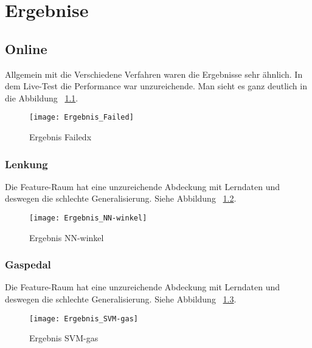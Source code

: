 
\chapter{Ergebnise} %
\label{cha:Ergebnise}

\section{Online} %
\label{sec:Online}
Allgemein mit die Verschiedene Verfahren waren die Ergebnisse sehr ähnlich. In dem Live-Test die Performance war unzureichende. Man sieht es ganz deutlich in die Abbildung ~\ref{fig:Ergebnis_Failed}.

\begin{figure}[htbp]
\begin{center}
\texttt{[image: Ergebnis\_Failed]}
\caption{Ergebnis Failedx}
\label{fig:Ergebnis_Failed}
\end{center}
\end{figure} 

\subsection{Lenkung} %
Die Feature-Raum hat eine unzureichende Abdeckung mit Lerndaten und deswegen die schlechte Generalisierung. Siehe Abbildung ~\ref{fig:Ergebnis_NN-winkel}.

\begin{figure}[htbp]
\begin{center}
\texttt{[image: Ergebnis\_NN-winkel]}
\caption{Ergebnis NN-winkel}
\label{fig:Ergebnis_NN-winkel}
\end{center}
\end{figure}

\subsection{Gaspedal} %
Die Feature-Raum hat eine unzureichende Abdeckung mit Lerndaten und deswegen die schlechte Generalisierung. Siehe Abbildung ~\ref{fig:Ergebnis_SVM-gas}.

\begin{figure}[htbp]
\begin{center}
\texttt{[image: Ergebnis\_SVM-gas]}
\caption{Ergebnis SVM-gas}
\label{fig:Ergebnis_SVM-gas}
\end{center}
\end{figure}

